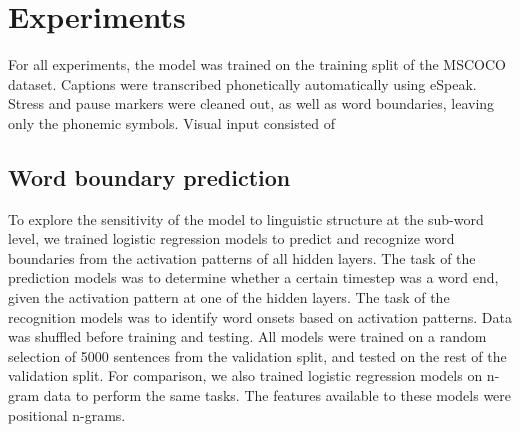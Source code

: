 \section{Experiments}
\label{sec:experiments}

For all experiments, the model was trained on the training split of the MSCOCO dataset. Captions were transcribed phonetically automatically using eSpeak. Stress and pause markers were cleaned out, as well as word boundaries, leaving only the phonemic symbols. Visual input consisted of %

\subsection{Word boundary prediction}
To explore the sensitivity of the model to linguistic structure at the sub-word level, we trained logistic regression models to predict and recognize word boundaries from the activation patterns of all hidden layers. The task of the prediction models was to determine whether a certain timestep was a word end, given the activation pattern at one of the hidden layers. The task of the recognition models was to identify word onsets based on activation patterns. Data was shuffled before training and testing. All models were trained on a random selection of 5000 sentences from the validation split, and tested on the rest of the validation split. %
For comparison, we also trained logistic regression models on n-gram data to perform the same tasks. The features available to these models were positional n-grams. %

